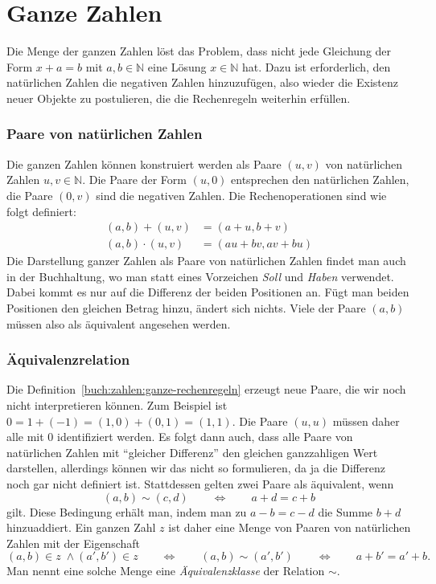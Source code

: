 %
%
%
\section{Ganze Zahlen
\label{buch:section:ganze-zahlen}}
Die Menge der ganzen Zahlen löst das Problem, dass nicht jede
Gleichung der Form $x+a=b$ mit $a, b \in \mathbb N$
eine Lösung $x \in \mathbb N$ hat.
Dazu ist erforderlich, den natürlichen Zahlen die negativen Zahlen
hinzuzufügen, also wieder die Existenz neuer Objekte zu postulieren,
die die Rechenregeln weiterhin erfüllen.

\subsubsection{Paare von natürlichen Zahlen}
Die ganzen Zahlen können konstruiert werden als Paare $(u,v)$ von 
natürlichen Zahlen $u,v\in\mathbb{N}$.
Die Paare der Form $(u,0)$ entsprechen den natürlichen Zahlen, die
Paare $(0,v)$ sind die negativen Zahlen.
Die Rechenoperationen sind wie folgt definiert:
\begin{equation}
\begin{aligned}
(a,b)+(u,v) &= (a+u,b+v)
\\
(a,b)\cdot (u,v) &= (au+bv,av+bu)
\end{aligned}
\label{buch:zahlen:ganze-rechenregeln}
\end{equation}
Die Darstellung ganzer Zahlen als Paare von natürlichen Zahlen
findet man auch in der Buchhaltung, wo man statt eines Vorzeichen
{\em Soll} und {\em Haben} verwendet.
Dabei kommt es nur auf die Differenz der beiden Positionen an.
Fügt man beiden Positionen den gleichen Betrag hinzu, ändert sich
nichts.
Viele der Paare $(a,b)$ müssen also als äquivalent angesehen
werden.

\subsubsection{Äquivalenzrelation}
Die Definition~\eqref{buch:zahlen:ganze-rechenregeln}
erzeugt neue Paare, die wir noch nicht interpretieren können.
Zum Beispiel ist $0=1+(-1) = (1,0) + (0,1) = (1,1)$.
Die Paare $(u,u)$ müssen daher alle mit $0$ identifiziert werden.
Es folgt dann auch, dass alle Paare von natürlichen Zahlen mit 
``gleicher Differenz'' den gleichen ganzzahligen Wert darstellen,
allerdings können wir das nicht so formulieren, da ja die Differenz
noch gar nicht definiert ist.
Stattdessen gelten zwei Paare als äquivalent, wenn
\begin{equation}
(a,b) \sim (c,d)
\qquad\Leftrightarrow\qquad
a+d = c+b
\label{buch:zahlen:ganz-aquivalenz}
\end{equation}
gilt.
Diese Bedingung erhält man, indem man zu $a-b=c-d$ die Summe $b+d$ 
hinzuaddiert.
Ein ganzen Zahl $z$ ist daher eine Menge von Paaren von natürlichen
Zahlen mit der Eigenschaft
\[
(a,b)\in z\;\wedge (a',b')\in z
\qquad\Leftrightarrow\qquad
(a,b)\sim(a',b')
\qquad\Leftrightarrow\qquad
a+b' = a'+b.
\]
Man nennt eine solche Menge eine {\em Äquivalenzklasse} der Relation $\sim$.


